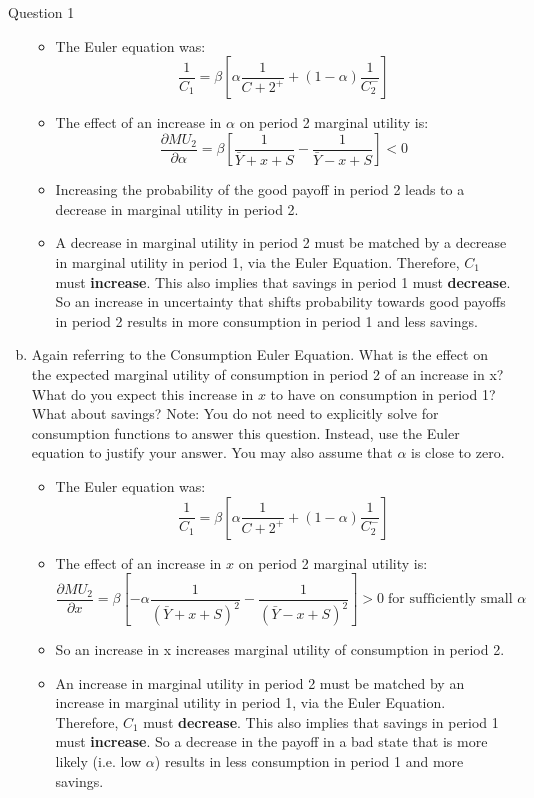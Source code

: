 \documentclass[a4paper]{article}
\newif\IfInSansMode
\begin{document}
\begin{questionbox}{Question 1}
\begin{enumerate}[(a)]
\begin{explanationbox}
				\begin{itemize}
					\item The Euler equation was:
					\[
						\frac{1}{C_1} = \beta \left[ \alpha\frac{1}{C+2^+} + (1-\alpha) \frac{1}{C_2^-} \right]
					\]
					\item The eﬀect of an increase in \( \alpha \) on period 2 marginal utility is:
					\[
						\frac{\partial MU_2}{\partial \alpha} = \beta \left[ \frac{1}{\bar{Y} + x + S} - \frac{1}{\bar{Y} - x + S} \right] < 0
					\]
					\item Increasing the probability of the good payoﬀ in period 2 leads to a decrease in marginal utility in period 2.
					\item A decrease in marginal utility in period 2 must be matched by a decrease in marginal utility in period 1, via the Euler Equation. Therefore, \( C_1 \) must \textbf{increase}. This also implies that savings in period 1 must \textbf{decrease}. So an increase in uncertainty that shifts probability towards good payoﬀs in period 2 results in more consumption in period 1 and less savings.
				\end{itemize}
			\end{explanationbox}
			\item Again referring to the Consumption Euler Equation. What is the eﬀect on the expected marginal utility of consumption in period 2 of an increase in x? What do you expect this increase in \( x \) to have on consumption in period 1? What about savings? Note: You do not need to explicitly solve for consumption functions to answer this question. Instead, use the Euler equation to justify your answer. You may also assume that \( \alpha \) is close to zero.
			\begin{explanationbox}
				\begin{itemize}
					\item The Euler equation was:
					\[
						\frac{1}{C_1} = \beta \left[ \alpha\frac{1}{C+2^+} + (1-\alpha) \frac{1}{C_2^-} \right]
					\]
					\item The eﬀect of an increase in \( x \) on period 2 marginal utility is:
					\[
						\frac{\partial MU_2}{\partial x} = \beta \left[ -\alpha\frac{1}{\left( \bar{Y} + x + S \right)^2} - \frac{1}{\left( \bar{Y} - x + S \right)^2} \right] > 0 \; \text{for sufficiently small } \alpha
					\]
					\item So an increase in x increases marginal utility of consumption in period 2.
					\item An increase in marginal utility in period 2 must be matched by an increase in marginal utility in period 1, via the Euler Equation. Therefore, \( C_1 \) must \textbf{decrease}. This also implies that savings in period 1 must \textbf{increase}. So a decrease in the payoﬀ in a bad state that is more likely (i.e. low \( \alpha \)) results in less consumption in period 1 and more savings.
				\end{itemize}
			\end{explanationbox}
		\end{enumerate}
	\end{questionbox}
\end{document}
